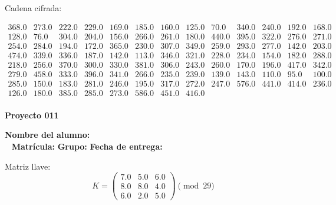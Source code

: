 \documentclass[12pt]{article}
\begin{document}
Cadena cifrada:
\begin{center}
$\begin{array}{lllllllllllll}
368.0 & 273.0 & 222.0 & 229.0 & 169.0 & 185.0 & 160.0 & 125.0 & 70.0 & 340.0 & 240.0 & 192.0 & 168.0\\
128.0 & 76.0 & 304.0 & 204.0 & 156.0 & 266.0 & 261.0 & 180.0 & 440.0 & 395.0 & 322.0 & 276.0 & 271.0\\
254.0 & 284.0 & 194.0 & 172.0 & 365.0 & 230.0 & 307.0 & 349.0 & 259.0 & 293.0 & 277.0 & 142.0 & 203.0\\
474.0 & 339.0 & 336.0 & 187.0 & 142.0 & 113.0 & 346.0 & 321.0 & 228.0 & 234.0 & 154.0 & 182.0 & 288.0\\
218.0 & 256.0 & 370.0 & 300.0 & 330.0 & 381.0 & 306.0 & 243.0 & 260.0 & 170.0 & 196.0 & 417.0 & 342.0\\
279.0 & 458.0 & 333.0 & 396.0 & 341.0 & 266.0 & 235.0 & 239.0 & 139.0 & 143.0 & 110.0 & 95.0 & 100.0\\
285.0 & 150.0 & 183.0 & 281.0 & 246.0 & 195.0 & 317.0 & 272.0 & 247.0 & 576.0 & 441.0 & 414.0 & 236.0\\
126.0 & 180.0 & 385.0 & 285.0 & 273.0 & 586.0 & 451.0 & 416.0\\
\end{array}$
\end{center}

\newpage


\textbf{Proyecto 011}

\textbf{Nombre del alumno:} \underline{\hspace{13cm}}\\\
\vspace{1cm}
\textbf{Matrícula:} \underline{\hspace{4cm}} \hspace{1cm}
\textbf{Grupo:} \underline{\hspace{2cm}}
\textbf{Fecha de entrega:} \underline{\hspace{2cm}}

\medskip

Matriz llave:
\[
K = \begin{pmatrix}
7.0 & 5.0 & 6.0\\
8.0 & 8.0 & 4.0\\
6.0 & 2.0 & 5.0
\end{pmatrix} \pmod{29}
\]
\end{document}
